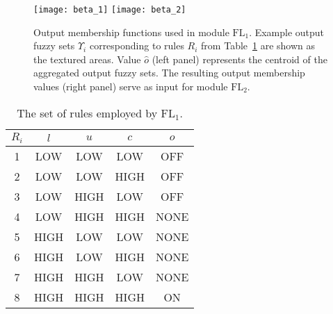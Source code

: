 \documentclass[twocolumn,natbib]{svjour3}
\begin{document}
\begin{figure}[!t]
\centering
\texttt{[image: beta\_1]}\hfill
\texttt{[image: beta\_2]}
\caption{Output membership functions used in module $\mathrm{FL}_{1}$. Example output fuzzy sets $\Upsilon_{\!i}$ corresponding to rules $R_i$ from Table~\ref{tab:rules-FL1} are shown as the textured areas. Value $\hat{o}$ (left panel) represents the centroid of the aggregated output fuzzy sets. The resulting output membership values (right panel) serve as input for module $\mathrm{FL}_{2}$.}
\label{fig:fuzzy-sets-FL1}
\end{figure}

\begin{table}
\caption{The set of rules employed by $\mathrm{FL}_{1}$.}
\label{tab:rules-FL1}
\centering
\begin{tabular}{c | c c c | c }
$R_{i}$ & $l$ & $u$ & $c$ & $o$ \\
\hline
1 & LOW  & LOW  & LOW  & OFF \\
2 & LOW  & LOW  & HIGH & OFF \\
3 & LOW  & HIGH & LOW  & OFF \\
\hline
4 & LOW  & HIGH & HIGH  & NONE \\ 
5 & HIGH & LOW  & LOW   & NONE \\ 
6 & HIGH & LOW  & HIGH  & NONE \\ 
7 & HIGH & HIGH & LOW   & NONE \\ 
\hline
8 & HIGH & HIGH & HIGH  & ON \\ 
\end{tabular}
\end{table}
\end{document}
